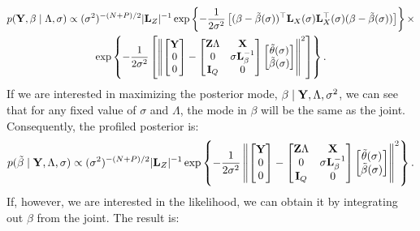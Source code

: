 \documentclass[10pt]{article}
\begin{document}
\begin{multline*}
p({\bf Y}, \beta \mid \Lambda, \sigma) \propto
(\sigma^2)^{-(N+P)/2}|{\bf L}_Z|^{-1}
\exp\left\{-\frac{1}{2\sigma^2}\left[
(\beta - \tilde\beta(\sigma))^\top{\bf L}_X(\sigma){\bf L}_X^\top(\sigma)
(\beta - \tilde\beta(\sigma)) \right]\right\} \times\\
% 
\exp\left\{-\frac{1}{2\sigma^2}\left[
\left\|
\begin{bmatrix}{\bf Y} \\ 0 \\ 0 \end{bmatrix} -
\begin{bmatrix}{\bf Z}\Lambda & {\bf X} \\
0 & \sigma{\bf L}^{-1}_\beta \\
{\bf I}_Q & 0
\end{bmatrix}
\begin{bmatrix} \tilde\theta(\sigma) \\ \tilde\beta(\sigma) \end{bmatrix}
\right\|^2\right]\right\}.
\end{multline*}
If we are interested in maximizing the posterior mode, $\beta \mid
{\bf Y}, \Lambda, \sigma^2$, we can see that for any fixed value of
$\sigma$ and $\Lambda$, the mode in $\beta$ will be the same as the
joint. Consequently, the profiled posterior is:
\begin{equation*}
p(\tilde{\beta} \mid {\bf Y}, \Lambda, \sigma) \propto
(\sigma^2)^{-(N+P)/2}|{\bf L}_Z|^{-1}
\exp\left\{-\frac{1}{2\sigma^2}
\left\|
\begin{bmatrix}{\bf Y} \\ 0 \\ 0 \end{bmatrix} -
\begin{bmatrix}{\bf Z}\Lambda & {\bf X} \\
0 & \sigma{\bf L}^{-1}_\beta \\
{\bf I}_Q & 0
\end{bmatrix}
\begin{bmatrix} \tilde\theta(\sigma) \\ \tilde\beta(\sigma) \end{bmatrix}
\right\|^2
\right\}.
\end{equation*}
If, however, we are interested in the likelihood, we can obtain it by
integrating out $\beta$ from the joint. The result is:
\end{document}
